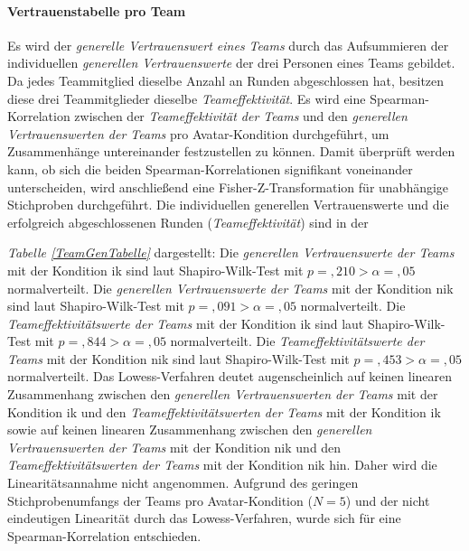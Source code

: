 \documentclass[a4paper,11pt]{article}%
\renewcommand{\\}{\vspace*{0.5\baselineskip} \newline}
\begin{document}
{{{{{{{{{\paragraph{Vertrauenstabelle pro Team}
Es wird der \textit{generelle Vertrauenswert eines Teams} durch das Aufsummieren der individuellen \textit{generellen Vertrauenswerte} der drei Personen eines Teams gebildet.
Da jedes Teammitglied dieselbe Anzahl an Runden abgeschlossen hat, besitzen diese drei Teammitglieder dieselbe \textit{Teameffektivität}.
Es wird eine Spearman-Korrelation zwischen der \textit{Teameffektivität der Teams} und den \textit{generellen Vertrauenswerten der Teams} pro Avatar-Kondition durchgeführt, um Zusammenhänge untereinander festzustellen zu können.
Damit überprüft werden kann, ob sich die beiden Spearman-Korrelationen signifikant voneinander unterscheiden, wird anschließend eine Fisher-Z-Transformation für unabhängige Stichproben durchgeführt. Die individuellen generellen Vertrauenswerte und die erfolgreich abgeschlossenen Runden (\textit{Teameffektivität}) sind in der {\textit{Tabelle \ref{TeamGenTabelle}} dargestellt:\\
Die \textit{generellen Vertrauenswerte der Teams} mit der Kondition \ac{ik} sind laut Shapiro-Wilk-Test mit $p =,210 > \alpha = ,05$ normalverteilt. \newline
Die \textit{generellen Vertrauenswerte der Teams} mit der Kondition \ac{nik} sind laut Shapiro-Wilk-Test mit $p =,091 > \alpha = ,05$ normalverteilt. \newline
Die \textit{Teameffektivitätswerte der Teams} mit der Kondition \ac{ik} sind laut Shapiro-Wilk-Test mit $p =,844 > \alpha = ,05$ normalverteilt. \newline
Die \textit{Teameffektivitätswerte der Teams} mit der Kondition \ac{nik} sind laut Shapiro-Wilk-Test mit $p =,453 > \alpha = ,05$ normalverteilt. \\
Das Lowess-Verfahren deutet augenscheinlich auf keinen linearen Zusammenhang zwischen den \textit{generellen Vertrauenswerten der Teams} mit der Kondition \ac{ik} und den \textit{Teameffektivitätswerten der Teams} mit der Kondition \ac{ik} sowie auf keinen linearen Zusammenhang zwischen den \textit{generellen Vertrauenswerten der Teams} mit der Kondition \ac{nik} und den \textit{Teameffektivitätswerten der Teams} mit der Kondition \ac{nik} hin. Daher wird die Linearitätsannahme nicht angenommen.\\
Aufgrund des geringen Stichprobenumfangs der Teams pro Avatar-Kondition ($N=5$) und der nicht eindeutigen Linearität durch das Lowess-Verfahren, wurde sich für eine Spearman-Korrelation entschieden.

}}}}}}}}}}
\end{document}
